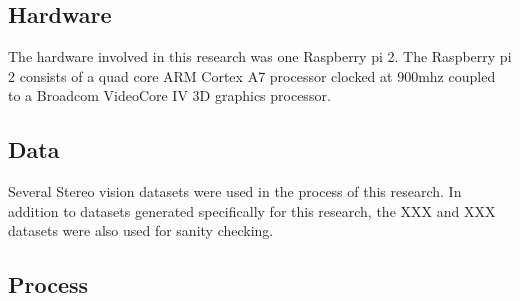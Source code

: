 \subsection{Hardware}
The hardware involved in this research was one Raspberry pi 2.  The Raspberry pi 2 consists of a quad core ARM Cortex A7 processor clocked at 900mhz coupled to a Broadcom VideoCore IV 3D graphics processor.
\subsection{Data}
Several Stereo vision datasets were used in the process of this research.  In addition to datasets generated specifically for this research, the XXX and XXX datasets were also used for sanity checking.
\subsection{Process}
